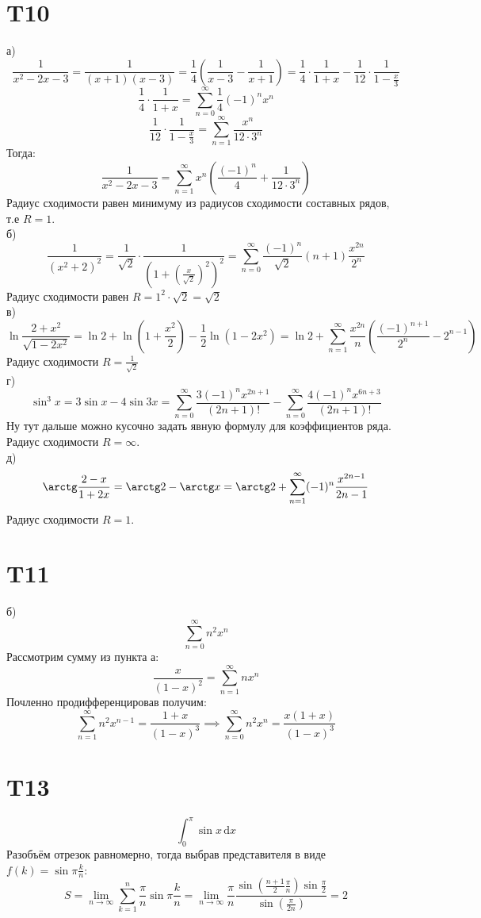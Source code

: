 \documentclass[12pt]{article}
\begin{document}
\section{T10}
а)
\[
    \frac{1}{x^2 - 2x - 3} = \frac{1}{(x+1)(x-3)} = \frac{1}{4} \left( \frac{1}{x - 3} - \frac{1}{x + 1} \right) = 
    \frac{1}{4} \cdot \frac{1}{1 + x} - \frac{1}{12} \cdot \frac{1}{1 - \frac{x}{3}}
\]
\[
    \frac{1}{4} \cdot \frac{1}{1 + x} = \sum_{n=0}^{\infty} \frac{1}{4} (-1)^n x^n
\]
\[
    \frac{1}{12} \cdot \frac{1}{1 - \frac{x}{3}} = \sum_{n=1}^{\infty} \frac{x^n}{12 \cdot 3^n}
\]
Тогда: 
\[
    \frac{1}{x^2 - 2x - 3} = \sum_{n=1}^{\infty} x^n \left( \frac{(-1)^n}{4} + \frac{1}{12 \cdot 3^n} \right) 
\]
Радиус сходимости равен минимуму из радиусов сходимости составных рядов, т.е $R = 1$. 
\\ б) 
\[
    \frac{1}{(x^2 + 2)^2} = \frac{1}{\sqrt{2}} \cdot \frac{1}{\left( 1 + \left( \frac{x}{\sqrt{2}} \right)^2 \right)^2 } = \sum_{n=0}^{\infty} \frac{(-1)^n}{\sqrt{2}} (n + 1) \frac{x^{2n}}{2^n}
\]
Радиус сходимости равен $R = 1^2 \cdot \sqrt{2} = \sqrt{2}$ 
\\ в) 
\[
    \ln \frac{2 + x^2}{\sqrt{1 - 2x^2}} = 
    \ln 2 + \ln \left( 1 + \frac{x^2}{2} \right)  - \frac{1}{2} \ln \left( 1 - 2x^2 \right)  = 
    \ln 2 + \sum_{n=1}^{\infty} \frac{x^{2n}}{n} \left( \frac{(-1)^{n+1}}{2^n} - 2^{n-1} \right) 
\]
Радиус сходимости $R = \frac{1}{\sqrt{2}}$
\\ г)
\[
    \sin^3 x = 3\sin x - 4\sin 3x = \sum_{n=0}^{\infty} \frac{3 (-1)^n x^{2n + 1}}{(2n + 1)!} - \sum_{n=0}^{\infty} \frac{4 (-1)^n x^{6n + 3}}{(2n + 1)!}
\]
Ну тут дальше можно кусочно задать явную формулу для коэффициентов ряда. Радиус сходимости $R = \infty$. 
\\ д) 
\[
    \arctg \frac{2 - x}{1 + 2x} = \arctg 2 - \arctg x = \arctg 2 + \sum_{n=1}^{\infty} (-1)^n \frac{x^{2n-1}}{2n-1} 
\]
Радиус сходимости $R = 1$. 
\section{T11}
б) 
\[
    \sum_{n=0}^{\infty} n^2 x^n 
\]
Рассмотрим сумму из пункта а:
\[
    \frac{x}{(1 - x)^2} = \sum_{n=1}^{\infty} n x^n
\] 
Почленно продифференцировав получим: 
\[
    \sum_{n=1}^{\infty} n^2 x^{n - 1} = \frac{1 + x}{(1 - x)^3} \implies \sum_{n=0}^{\infty} n^2 x^n = \frac{x(1 + x)}{(1 - x)^{3} } 
\]
\section{T13}
\[
    \int_{0}^{\pi } \sin x \,\mathrm{d}x 
\]
Разобъём отрезок равномерно, тогда выбрав представителя в виде $f(k) = \sin \pi \frac{k}{n}$:
\[
    S = \lim_{n \to \infty} \sum_{k=1}^{n} \frac{\pi }{n} \sin \pi \frac{k}{n} = \lim_{n \to \infty} \frac{\pi}{n} \frac{\sin \left( \frac{n+1}{2} \frac{\pi}{n} \right) \sin \frac{\pi}{2}}{\sin \left( \frac{\pi}{2n} \right) } = 2
\] 
\end{document}
